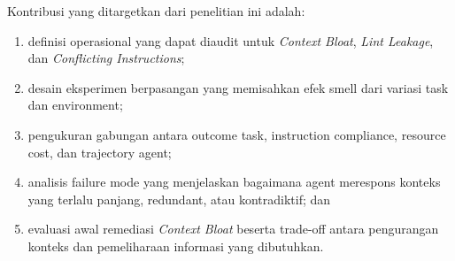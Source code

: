 Kontribusi yang ditargetkan dari penelitian ini adalah:

\begin{enumerate}[leftmargin=*]
    \item definisi operasional yang dapat diaudit untuk \textit{Context Bloat}, \textit{Lint Leakage}, dan \textit{Conflicting Instructions};
    \item desain eksperimen berpasangan yang memisahkan efek smell dari variasi task dan environment;
    \item pengukuran gabungan antara outcome task, instruction compliance, resource cost, dan trajectory agent;
    \item analisis failure mode yang menjelaskan bagaimana agent merespons konteks yang terlalu panjang, redundant, atau kontradiktif; dan
    \item evaluasi awal remediasi \textit{Context Bloat} beserta trade-off antara pengurangan konteks dan pemeliharaan informasi yang dibutuhkan.
\end{enumerate}
